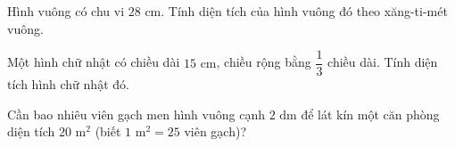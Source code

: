 \begin{ex} %
Hình vuông có chu vi $28\text{ cm}$. Tính diện tích của hình vuông đó theo xăng-ti-mét vuông.
\end{ex}

\begin{ex} %
Một hình chữ nhật có chiều dài $15\text{ cm}$, chiều rộng bằng $\dfrac{1}{3}$ chiều dài. Tính diện tích hình chữ nhật đó.
\end{ex}

\begin{ex} %
Cần bao nhiêu viên gạch men hình vuông cạnh $2\text{ dm}$ để lát kín một căn phòng diện tích $20\text{ m}^2$ (biết $1\text{ m}^2 = 25$ viên gạch)?
\end{ex}
